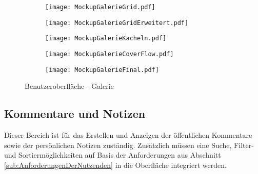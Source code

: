 \begin{figure}[h!]
\begin{subfigure}[c]{0.5\textwidth}
\texttt{[image: MockupGalerieGrid.pdf]}
\label{fig:MockupGalerieGrid}
\end{subfigure}%
\begin{subfigure}[c]{0.5\textwidth}
\texttt{[image: MockupGalerieGridErweitert.pdf]}
\label{fig:MockupGalerieGridErweitert}
\end{subfigure}
\par\bigskip
\begin{subfigure}[c]{0.5\textwidth}
\texttt{[image: MockupGalerieKacheln.pdf]}
\label{fig:MockupGalerieKacheln}
\end{subfigure}%
\begin{subfigure}[c]{0.5\textwidth}
\texttt{[image: MockupGalerieCoverFlow.pdf]}
\label{fig:MockupGalerieCoverFlow}
\end{subfigure}
\par\bigskip
\begin{subfigure}[c]{\textwidth}
\texttt{[image: MockupGalerieFinal.pdf]}
\label{fig:MockupGalerieFinal}
\end{subfigure}
\caption{Benutzeroberfläche - Galerie}
\label{fig:MockupGalerie}
\end{figure}

\subsection{Kommentare und Notizen}
Dieser Bereich ist für das Erstellen und Anzeigen der öffentlichen Kommentare sowie der persönlichen Notizen zuständig. Zusätzlich müssen eine Suche, Filter- und Sortiermöglichkeiten auf Basis der Anforderungen aus Abschnitt \ref{sub:AnforderungenDerNutzenden} in die Oberfläche integriert werden.

